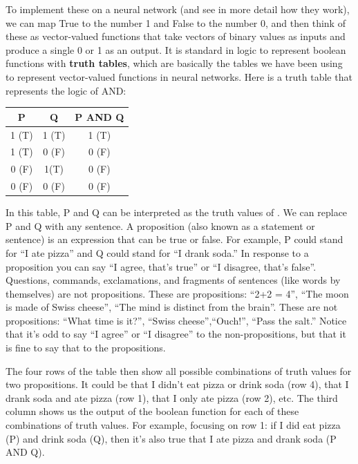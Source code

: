 To implement these on a neural network (and see in more detail how they work), we  can map True to the number 1 and False to the number 0, and then think of these as vector-valued functions that take vectors of binary values as inputs and produce a single 0 or 1 as an output. It is standard in logic to represent boolean functions with \textbf{truth tables}, which are basically the tables we have been using to represent vector-valued functions in neural networks. Here is a truth table that represents the logic of AND:

\begin{center}
\begin{tabular}{| c | c || c | }
\hline
  P  & Q & P AND Q  \\
\hline
  1 (T) & 1 (T) & 1 (T)  \\
\hline
 1 (T) & 0 (F) & 0 (F)  \\
\hline
 0 (F) & 1(T) & 0  (F) \\
\hline
 0 (F) & 0 (F) & 0 (F) \\
\hline
\end{tabular}
\end{center}


In this table,  P and Q can be interpreted as the truth values of . We can replace P and Q with any sentence. A proposition (also known as a statement or sentence) is an expression that can be true or false. For example, P could stand for ``I ate pizza'' and Q could stand for ``I drank soda.''  In response to a proposition you can say ``I agree, that's true'' or ``I disagree, that's false''. Questions, commands, exclamations, and fragments of sentences (like words by themselves) are not propositions. These are propositions: ``2+2 = 4'', ``The moon is made of Swiss cheese'', ``The mind is distinct from the brain''.  These are not propositions: ``What time is it?'', ``Swiss cheese'',``Ouch!'', ``Pass the salt.'' Notice that it's odd to say ``I agree'' or ``I disagree'' to the non-propositions, but that it is fine to say that to the propositions.

The four rows of the table then show all possible combinations of truth values for  two propositions. It could be that I didn't eat  pizza or drink soda (row 4), that I drank soda and ate pizza (row 1), that I only ate pizza (row 2), etc. The third column shows us the output of the boolean function for each of these combinations of truth values. For example, focusing on row 1: if I did eat pizza (P) and drink soda (Q), then it's also true that I ate pizza and drank soda (P AND Q). 

